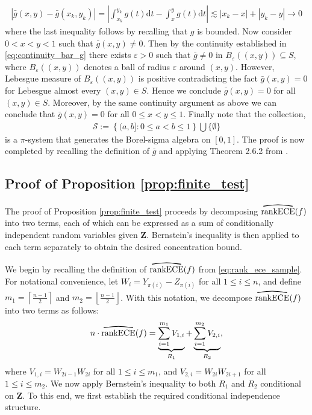 \documentclass[11pt]{article}
\numberwithin{equation}{section}
\theoremstyle{definition}
\newcommand{\cS}{\mathcal{S}}
\newcommand{\bZ}{\bm{Z}}
\newcommand{\ra}{\rightarrow}
\newcommand{\vep}{\varepsilon}
\newcommand{\myoverline}[2][3.5em]{%
  \overset{%
    \tikz[baseline=-0.1ex]{
      \draw[line width=0.75pt]
        (0,0) .. controls (#1/2,0.5ex) .. (#1,0);
    }%
  }{#2}%
}
\newcommand{\rankECE}{\mathrm{rankECE}}
\newcommand{\hatrankECE}{\myoverline{\rankECE}}
\newcommand{\rmd}{\mathrm{d}}
\begin{document}
    \begin{align}\label{eq:continuity_bar_g}
        \left|\bar g(x,y) - \bar g(x_k, y_k)\right| = \left|\int_{x_k}^{y_k}g(t)\rmd t - \int_{x}^{y}g(t)\rmd t\right|\lesssim \left|x_k - x\right| + \left|y_k - y\right|\ra 0
    \end{align}
    where the last inequality follows by recalling that $g$ is bounded. Now consider $0< x<y< 1$ such that $\bar g(x,y)\neq 0$. Then by the continuity established in \eqref{eq:continuity_bar_g} there exists $\vep>0$ such that $\bar g\neq 0$ in $B_{\vep}((x,y))\subseteq S$, where $B_{\vep}((x,y))$ denotes a ball of radius $\vep$ around $(x,y)$. However, Lebesgue measure of $B_{\vep}((x,y))$ is positive contradicting the fact $\bar g(x,y) = 0$ for Lebesgue almost every $(x,y)\in S$. Hence we conclude $\bar g(x,y) = 0$ for all $(x,y)\in S$. Moreover, by the same continuity argument as above we can conclude that $\bar g(x,y) = 0$ for all $0\leq x<y\leq 1$. Finally note that the collection,
    \begin{align*}
        \cS := \left\{(a,b]: 0\leq a<b\leq 1\right\}\bigcup\{\emptyset\}
    \end{align*}
    is a $\pi$-system that generates the Borel-sigma algebra on $[0,1]$. The proof is now completed by recalling the definition of $\bar g$ and applying Theorem 2.6.2 from \cite{gut2006probability}.

\subsection{Proof of Proposition \ref{prop:finite_test}}\label{sec:proofof_prop_finite_test}

The proof of Proposition \ref{prop:finite_test} proceeds by decomposing $\hatrankECE(f)$ into two terms, each of which can be expressed as a sum of conditionally independent random variables given $\bZ$. Bernstein's inequality is then applied to each term separately to obtain the desired concentration bound. 

We begin by recalling the definition of $\hatrankECE(f)$ from \eqref{eq:rank_ece_sample}. For notational convenience, let $W_i = Y_{\pi(i)} - Z_{\pi(i)}$ for all $1 \leq i \leq n$, and define $m_1 = \left\lceil \frac{n-1}{2}\right\rceil$ and $m_2 = \left\lfloor \frac{n-1}{2}\right\rfloor$. With this notation, we decompose $\hatrankECE(f)$ into two terms as follows:
\begin{align*}
    n\cdot\hatrankECE(f)
    =
    \underbrace{\sum_{i=1}^{m_1} V_{1,i}}_{R_1}
    +
    \underbrace{\sum_{i=1}^{m_2} V_{2,i}}_{R_2},
\end{align*}
where $V_{1,i} = W_{2i-1}W_{2i}$ for all $1 \leq i \leq m_1$, and $V_{2,i} = W_{2i}W_{2i+1}$ for all $1 \leq i \leq m_2$. We now apply Bernstein's inequality to both $R_1$ and $R_2$ conditional on $\bZ$. To this end, we first establish the required conditional independence structure.
\end{document}
